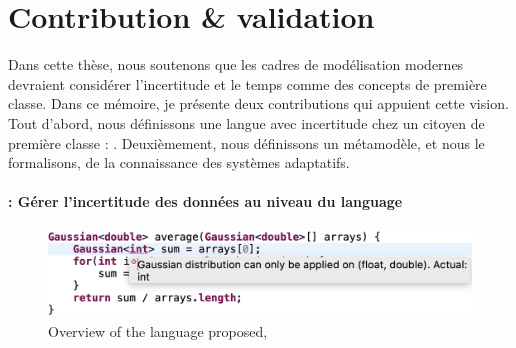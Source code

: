 \section{Contribution \& validation}

%
Dans cette thèse, nous soutenons que les cadres de modélisation modernes devraient considérer l'incertitude et le temps comme des concepts de première classe.
Dans ce mémoire, je présente deux contributions qui appuient cette vision.
Tout d'abord, nous définissons une langue avec incertitude chez un citoyen de première classe : \langName. 
Deuxièmement, nous définissons un métamodèle, et nous le formalisons, de la connaissance des systèmes adaptatifs. 

\paragraph{\langName{}: Gérer l'incertitude des données au niveau du language}
\begin{figure}
	\centering
	\includegraphics[width=\linewidth]{img/chapt-intro/approach/aintea-overview}
	\caption{Overview of the language proposed, \langName{}}
	\label{fig:french:contrib:aintea}
\end{figure}

